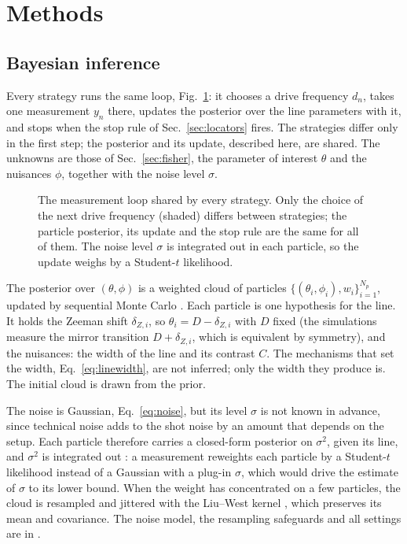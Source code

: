 \section{Methods}
\label{sec:methods}

\subsection{Bayesian inference}
\label{sec:bayes}

Every strategy runs the same loop, Fig.~\ref{fig:bayes-loop}: it chooses a drive frequency $d_n$, takes one
measurement $y_n$ there, updates the posterior over the line parameters with it, and stops when the stop rule of
Sec.~\ref{sec:locators} fires. The strategies differ only in the first step; the posterior and its update, described
here, are shared. The unknowns are those of Sec.~\ref{sec:fisher}, the parameter of interest $\theta$ and the
nuisances $\phi$, together with the noise level $\sigma$.

\begin{figure}[t]
\centering

\caption{The measurement loop shared by every strategy. Only the choice of the next drive frequency (shaded)
differs between strategies; the particle posterior, its update and the stop rule are the same for all of them.
The noise level $\sigma$ is integrated out in each particle, so the update weighs by a Student-$t$ likelihood.}
\label{fig:bayes-loop}
\end{figure}

The posterior over $(\theta,\phi)$ is a weighted cloud of particles $\{(\theta_i,\phi_i),w_i\}_{i=1}^{N_p}$, updated
by sequential Monte Carlo \cite{doucet2001smc}. Each particle is one hypothesis for the line. It holds the Zeeman
shift $\delta_{Z,i}$, so $\theta_i=D-\delta_{Z,i}$ with $D$ fixed (the simulations measure the mirror
transition $D+\delta_{Z,i}$, which is equivalent by symmetry), and the nuisances: the width of the line and its
contrast $C$. The mechanisms that set the width, Eq.~\eqref{eq:linewidth}, are not inferred; only the width they
produce is. The initial cloud is drawn from the prior.

The noise is Gaussian, Eq.~\eqref{eq:noise}, but its level $\sigma$ is not known in advance, since technical noise
adds to the shot noise by an amount that depends on the setup. Each particle therefore carries a closed-form
posterior on $\sigma^2$, given its line, and $\sigma^2$ is integrated out \cite{storvik2002,carvalho2010pl}: a
measurement reweights each particle by a Student-$t$ likelihood instead of a Gaussian with a plug-in $\sigma$, which
would drive the estimate of $\sigma$ to its lower bound. When the weight has concentrated on a few particles, the
cloud is resampled \cite{kitagawa1996} and jittered with the Liu--West kernel \cite{liuwest2001}, which preserves its
mean and covariance. The noise model, the resampling safeguards and all settings are in .

